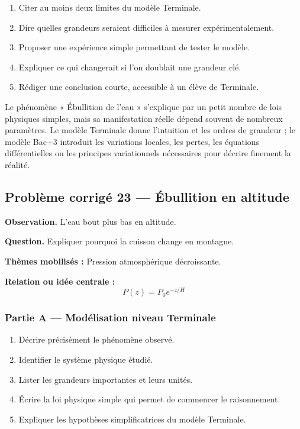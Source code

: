 \documentclass[11pt,a4paper]{article}
\begin{document}
\begin{enumerate}
  \item Citer au moins deux limites du modèle Terminale.
  \item Dire quelles grandeurs seraient difficiles à mesurer expérimentalement.
  \item Proposer une expérience simple permettant de tester le modèle.
  \item Expliquer ce qui changerait si l'on doublait une grandeur clé.
  \item Rédiger une conclusion courte, accessible à un élève de Terminale.
\end{enumerate}

\begin{corrigebox}
Le phénomène « Ébullition de l'eau » s'explique par un petit nombre de lois physiques simples, mais sa manifestation réelle dépend souvent de nombreux paramètres. Le modèle Terminale donne l'intuition et les ordres de grandeur ; le modèle Bac+3 introduit les variations locales, les pertes, les équations différentielles ou les principes variationnels nécessaires pour décrire finement la réalité.
\end{corrigebox}

\subsection{Problème corrigé 23 — Ébullition en altitude}

\begin{exercicebox}
\textbf{Observation.} L'eau bout plus bas en altitude.

\medskip
\textbf{Question.} Expliquer pourquoi la cuisson change en montagne.

\medskip
\textbf{Thèmes mobilisés :} Pression atmosphérique décroissante.

\medskip
\textbf{Relation ou idée centrale :}
\[
P(z)=P_0e^{-z/H}
\]
\end{exercicebox}

\subsubsection*{Partie A — Modélisation niveau Terminale}

\begin{enumerate}
  \item Décrire précisément le phénomène observé.
  \item Identifier le système physique étudié.
  \item Lister les grandeurs importantes et leurs unités.
  \item Écrire la loi physique simple qui permet de commencer le raisonnement.
  \item Expliquer les hypothèses simplificatrices du modèle Terminale.
\end{enumerate}
\end{document}
